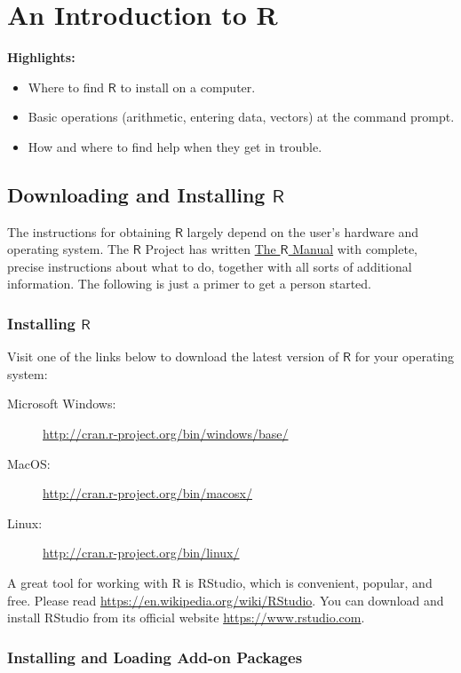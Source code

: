 \chapter{An Introduction to R}
\label{sec-2}

\textbf{Highlights:}
\begin{itemize}
\item Where to find \(\mathsf{R}\) to install on a computer.
\item Basic operations (arithmetic, entering data, vectors) at the command
prompt.
\item How and where to find help when they get in trouble.
\end{itemize}

\section{Downloading and Installing \(\mathsf{R}\)}
\label{sec-2-1}

The instructions for obtaining \(\mathsf{R}\) largely depend on the
user's hardware and operating system. The \(\mathsf{R}\) Project has
written \href{http://cran.r-project.org/manuals.html}{The \(\mathsf{R}\) Manual} with
complete, precise instructions about what to do, together with all
sorts of additional information. The following is just a primer to get
a person started.

\subsection{Installing \(\mathsf{R}\)}
\label{sec-2-1-1}

Visit one of the links below to download the latest version of \(\mathsf{R}\) 
for your operating system:

\begin{description}
\item[{Microsoft Windows:}] \url{http://cran.r-project.org/bin/windows/base/}
\item[{MacOS:}] \url{http://cran.r-project.org/bin/macosx/}
\item[{Linux:}] \url{http://cran.r-project.org/bin/linux/}
\end{description}

A great tool for working with R is RStudio, which is convenient, popular, and free.
Please read \url{https://en.wikipedia.org/wiki/RStudio}.
You can download and install RStudio from its official website \url{https://www.rstudio.com}.

\subsection{Installing and Loading Add-on Packages}
\label{sec-2-1-2}

